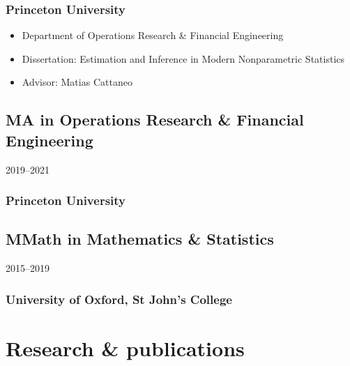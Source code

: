 \documentclass{wgu-cv}
\begin{document}
\subsubsection{Princeton University}

\begin{itemize}

  \item Department of Operations Research \& Financial Engineering

  \item Dissertation: Estimation and Inference in Modern
    Nonparametric Statistics

  \item Advisor: Matias Cattaneo

\end{itemize}

\subsection{MA in Operations Research \& Financial Engineering}
{2019--2021}
\subsubsection{Princeton University}

\subsection{MMath in Mathematics \& Statistics}
{2015--2019}
\subsubsection{University of Oxford, St John's College}

\vspace*{3mm}
\section{Research \& publications}
\end{document}
